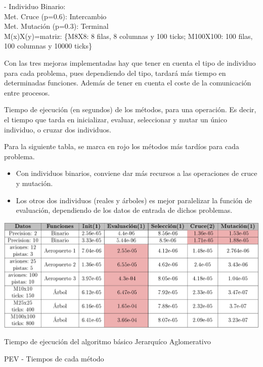 \begin{flushleft}
\begin{mdframed}[roundcorner=5pt]
\begin{tcolorbox}[boxrule=0.5pt, fontupper=\small]
			- Individuo Binario:\\
			Met. Cruce (p=0.6): Intercambio\\
			Met. Mutación (p=0.3): Terminal \\
			M(x)X(y)=matriz: \{M8X8: 8 filas, 8 columnas y 100 ticks; M100X100: 100 filas, 100 columnas y 10000 ticks\}				
			
		\end{tcolorbox}
		
	\end{mdframed}
	\end{flushleft}

	Con las tres mejoras implementadas hay que tener en cuenta el tipo de individuo para cada problema, pues dependiendo del tipo, tardará más tiempo en determinadas funciones. Además de tener en cuenta el coste de la comunicación entre procesos.
	
	Tiempo de ejecución (en segundos) de los métodos, para una operación. Es decir, el tiempo que tarda en inicializar, evaluar, seleccionar y mutar un único individuo, o cruzar dos individuos. 
	
	\vspace{0.3cm}

	Para la siguiente tabla, se marca en rojo los métodos más tardíos para cada problema. 
	\begin{itemize}
		\item Con individuos binarios, conviene dar más recursos a las operaciones de cruce y mutación.
		\item Los otros dos individuos (reales y árboles) es mejor paralelizar la función de evaluación, dependiendo de los datos de entrada de dichos problemas.
	\end{itemize}
 
	

	
	\begin{table}[!h]
		\centering
		\includegraphics[width=1\textwidth]{images/chapter_4/tabla_pev}
		\caption{Tiempo de ejecución del algoritmo básico Jerarquíco Aglomerativo}
		\caption{PEV - Tiempos de cada método}
		\label{tab:pev}
	\end{table}
	
